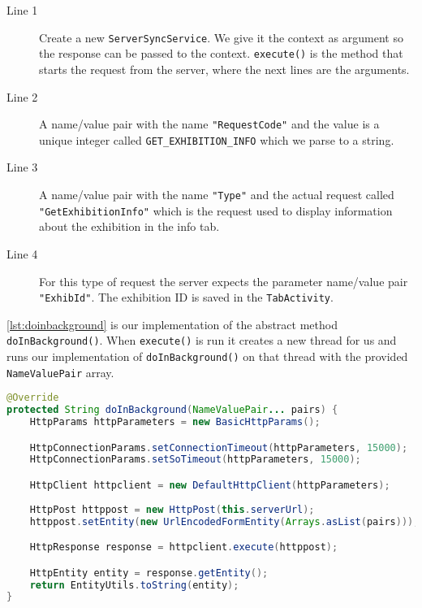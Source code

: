 \begin{description}
\item[Line 1] Create a new \lstinline|ServerSyncService|. We give it the context as argument so the response can be passed to the context. \lstinline|execute()| is the method that starts the request from the server, where the next lines are the arguments.
\item[Line 2] A name/value pair with the name \lstinline|"RequestCode"| and the value is a unique integer called \lstinline|GET_EXHIBITION_INFO| which we parse to a string.
\item[Line 3] A name/value pair with the name \lstinline|"Type"| and the actual request called \lstinline|"GetExhibitionInfo"| which is the request used to display information about the exhibition in the info tab.
\item[Line 4] For this type of request the server expects the parameter name/value pair \lstinline|"ExhibId"|. The exhibition ID is saved in the \lstinline|TabActivity|.
\end{description}
\autoref{lst:doinbackground} is our implementation of the abstract method \lstinline|doInBackground()|. When \lstinline|execute()| is run it creates a new thread for us and runs our implementation of \lstinline|doInBackground()| on that thread with the provided \lstinline|NameValuePair| array.

\begin{lstlisting}[language=java, label=lst:doinbackground, caption={The async abstract method \lstinline|doInBackground()|}]
@Override
protected String doInBackground(NameValuePair... pairs) {
    HttpParams httpParameters = new BasicHttpParams();

    HttpConnectionParams.setConnectionTimeout(httpParameters, 15000);
    HttpConnectionParams.setSoTimeout(httpParameters, 15000);

    HttpClient httpclient = new DefaultHttpClient(httpParameters);
    
    HttpPost httppost = new HttpPost(this.serverUrl);
    httppost.setEntity(new UrlEncodedFormEntity(Arrays.asList(pairs)));

    HttpResponse response = httpclient.execute(httppost);

    HttpEntity entity = response.getEntity();
    return EntityUtils.toString(entity);
}
\end{lstlisting}

